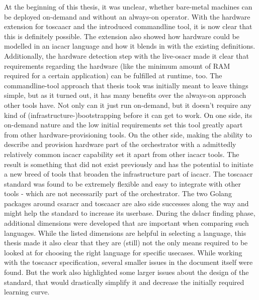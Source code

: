 At the beginning of this thesis, it was unclear, whether bare-metal machines can be deployed on-demand and without an always-on operator. With the hardware extension for \gls{toscaacr} and the introduced commandline tool, it is now clear that this is definitely possible.
\newline
The extension also showed how hardware could be modelled in an \gls{iacacr} language and how it blends in with the existing definitions.
\newline
Additionally, the hardware detection step with the live-\gls{osacr} made it clear that requirements regarding the hardware (like the minimum amount of RAM required for a certain application) can be fulfilled at runtime, too.
\newline\smallskip
The commandline-tool approach that thesis took was initially meant to leave things simple, but as it turned out, it has many benefits over the always-on approach other tools have. Not only can it just run on-demand, but it doesn't require any kind of (infrastructure-)bootstrapping before it can get to work.
\newline
On one side, its on-demand nature and the low initial requirements set this tool greatly apart from other hardware-provisioning tools. On the other side, making the ability to describe and provision hardware part of the orchestrator with a admittedly relatively common \gls{iacacr} capability set it apart from other \gls{iacacr} tools. The result is something that did not exist previously and has the potential to initiate a new breed of tools that broaden the infrastructure part of \gls{iacacr}.
\newline\smallskip
The \gls{toscaacr} standard was found to be extremely flexible and easy to integrate with other tools - which are not necessarily part of the orchestrator. The two Golang packages around \gls{csaracr} and \gls{toscaacr} are also side successes along the way and might help the standard to increase its userbase.
\newline
During the \gls{dslacr} finding phase, additional dimensions were developed that are important when comparing such languages. While the listed dimensions are helpful in selecting a language, this thesis made it also clear that they are (still) not the only means required to be looked at for choosing the right language for specific usecases.
\newline
While working with the \gls{toscaacr} specification, several smaller issues in the document itself were found. But the work also highlighted some larger issues about the design of the standard, that would drastically simplify it and decrease the initially required learning curve.
